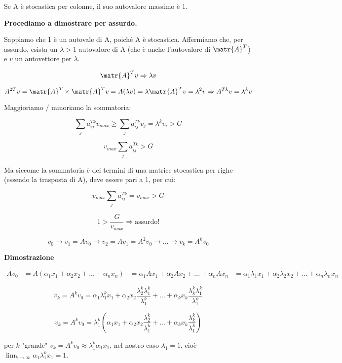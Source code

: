 \documentclass[\main/main.tex]{subfiles}
\begin{document}
\begin{theorem}
Se A è stocastica per colonne, il suo autovalore massimo è 1.

\textbf{Procediamo a dimostrare per assurdo.}

Sappiamo che 1 è un autovale di A, poiché A è stocastica. Affermiamo che, per assurdo, esista un $\lambda > 1$ autovalore di A (che è anche l'autovalore di $\matr{A}^T$) e $v$ un autovettore per $\lambda$.

\[
	\matr{A}^Tv \Rightarrow \lambda v
\]

\[
	A^{2T} v = \matr{A}^T \times \matr{A}^T v = A (\lambda v) = \lambda \matr{A}^T v = \lambda ^2 v \Rightarrow A^{Tk} v = \lambda ^ k v
\]

Maggioriamo / minoriamo la sommatoria:

\[
	\sum_j a^{Tk}_{ij} v_{max} \geq \sum_j a_{ij}^{Tk} v_j = \lambda ^ k v_i > G
\]

\[
	v_{max} \sum_j a_{ij}^{Tk} > G
\]

Ma siccome la sommatoria è dei termini di una matrice stocastica per righe (essendo la trasposta di A), deve essere pari a 1, per cui:

\[
	v_{max} \sum_j a_{ij}^{Tk} = v_{max} > G
\]

\[
	1 > \dfrac{G}{v_{max}} \Rightarrow \text{assurdo!}
\]

\end{theorem}

\begin{theorem}
\[
	v_0 \rightarrow v_1 = A v_0 \rightarrow v_2 = A v_1 = A^2 v_0 \rightarrow ... \rightarrow v_k = A^k v_0
\]

\textbf{Dimostrazione}

\begin{align*}
	A v_0 &= A(\alpha_1 x_1 + \alpha_2 x_2 + ... + \alpha_n x_n)
			 &= \alpha_1 A x_1 + \alpha_2 A x_2 + ... + \alpha_n A x_n
			 &= \alpha_1 \lambda_1 x_1 + \alpha_2 \lambda_2 x_2 + ... + \alpha_n \lambda_n x_n
\end{align*}

\[
	v_k = A^k v_0 = \alpha_1 \lambda_1^k x_1 +  \alpha_2 x_2  \dfrac{ \lambda_2^k \lambda_1^k}{ \lambda_1^k}+ ... +  \alpha_k x_k  \dfrac{ \lambda_k^k \lambda_1^k}{ \lambda_1^k}
\]

\[
	v_k = A^k v_0 =  \lambda_1^k (\alpha_1 x_1 +  \alpha_2 x_2  \dfrac{ \lambda_2^k}{ \lambda_1^k}+ ... +  \alpha_k x_k  \dfrac{ \lambda_k^k}{ \lambda_1^k})
\]

per $k$ "grande" $v_k = A^k v_0 \approx \lambda^k_1 \alpha_1 x_1$, nel nostro caso $\lambda_1 = 1$, cioè $\lim_{k \rightarrow \infty} \alpha_1 \lambda_1^k x_1 = 1$.

\end{theorem}
\end{document}

